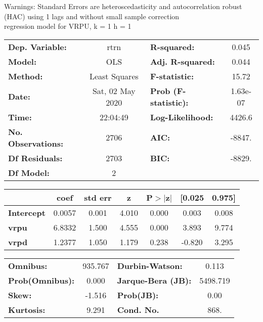 Warnings: \newline
 [1] Standard Errors are heteroscedasticity and autocorrelation robust (HAC) using 1 lags and without small sample correction\\ 

regression model for VRPU, k = 1 h = 1\begin{center}
\begin{tabular}{lclc}
\toprule
\textbf{Dep. Variable:}    &       rtrn       & \textbf{  R-squared:         } &     0.045   \\
\textbf{Model:}            &       OLS        & \textbf{  Adj. R-squared:    } &     0.044   \\
\textbf{Method:}           &  Least Squares   & \textbf{  F-statistic:       } &     15.72   \\
\textbf{Date:}             & Sat, 02 May 2020 & \textbf{  Prob (F-statistic):} &  1.63e-07   \\
\textbf{Time:}             &     22:04:49     & \textbf{  Log-Likelihood:    } &    4426.6   \\
\textbf{No. Observations:} &        2706      & \textbf{  AIC:               } &    -8847.   \\
\textbf{Df Residuals:}     &        2703      & \textbf{  BIC:               } &    -8829.   \\
\textbf{Df Model:}         &           2      & \textbf{                     } &             \\
\bottomrule
\end{tabular}
\begin{tabular}{lcccccc}
                   & \textbf{coef} & \textbf{std err} & \textbf{z} & \textbf{P$> |$z$|$} & \textbf{[0.025} & \textbf{0.975]}  \\
\midrule
\textbf{Intercept} &       0.0057  &        0.001     &     4.010  &         0.000        &        0.003    &        0.008     \\
\textbf{vrpu}      &       6.8332  &        1.500     &     4.555  &         0.000        &        3.893    &        9.774     \\
\textbf{vrpd}      &       1.2377  &        1.050     &     1.179  &         0.238        &       -0.820    &        3.295     \\
\bottomrule
\end{tabular}
\begin{tabular}{lclc}
\textbf{Omnibus:}       & 935.767 & \textbf{  Durbin-Watson:     } &    0.113  \\
\textbf{Prob(Omnibus):} &   0.000 & \textbf{  Jarque-Bera (JB):  } & 5498.719  \\
\textbf{Skew:}          &  -1.516 & \textbf{  Prob(JB):          } &     0.00  \\
\textbf{Kurtosis:}      &   9.291 & \textbf{  Cond. No.          } &     868.  \\
\bottomrule
\end{tabular}
\end{center}

